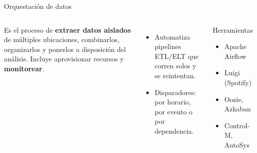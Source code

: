 \documentclass[aspectratio=169]{beamer}
\begin{document}
\begin{frame}{Orquestaci\'on de datos}
  \begin{columns}[c]
      Es el proceso de \textbf{extraer datos aislados} de m\'ultiples
      ubicaciones, combinarlos, organizarlos y ponerlos a disposici\'on del
      an\'alisis. Incluye aprovisionar recursos y \textbf{monitorear}.
      \vspace{0.4em}
      \begin{itemize}
        \item Automatiza pipelines ETL/ELT que corren solos y se reintentan.
        \item Disparadores: por horario, por evento o por dependencia.
      \end{itemize}
      \begin{block}{Herramientas}
        \begin{itemize}
          \item Apache Airflow
          \item Luigi (Spotify)
          \item Oozie, Azkaban
          \item Control-M, AutoSys
        \end{itemize}
      \end{block}
  \end{columns}
\end{frame}
\end{document}
